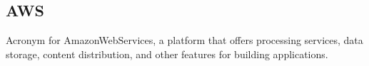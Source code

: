 



\subsection*{AWS}
Acronym for AmazonWebServices, a platform that offers processing services, data storage, content distribution, and other features for building applications. 